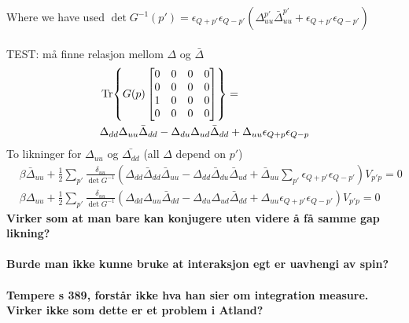 \documentclass{article}
\begin{document}
Where we have used $\det{G^{-1}}(p') = \epsilon_{Q+p'} \epsilon_{Q-p'} \left( \Delta^{p'}_{uu} \bar{\Delta}^{p'}_{uu} + \epsilon_{Q+p'} \epsilon_{Q-p'}\right)$
\\
\\
TEST:
må finne relasjon mellom $\Delta$ og $\bar{\Delta}$
\begin{align}
&\Tr{G(p) 
    \begin{bmatrix}
    0 & 0 & 0 & 0 \\
    0 & 0 & 0 & 0 \\ 
    1 & 0 & 0 & 0 \\ 
    0 & 0 & 0 & 0
    \end{bmatrix}}= \\ 
&\Delta_{dd} \Delta_{uu} \bar{\Delta}_{dd} - \Delta_{du} \Delta_{ud} \bar{\Delta}_{dd} + \Delta_{uu} \epsilon_{Q+p} \epsilon_{Q-p}
\end{align}
To likninger for $\Delta_{uu}$ og $\bar{\Delta_{dd}}$ (all $\Delta$ depend on $p'$)
\begin{align}
    &\beta{\bar{\Delta}}_{uu} + \frac{1}{2} \sum_{p'} \frac{\delta_{uu}}{\det{G^{-1}}}\left(\Delta_{dd} \bar{\Delta}_{dd} \bar{\Delta}_{uu} - \Delta_{dd} \bar{\Delta}_{du} \bar{\Delta}_{ud} + \bar{\Delta}_{uu} \sum_{p'} \epsilon_{Q+p'} \epsilon_{Q-p'}\right) V_{p'p} = 0\nonumber\\
    &\beta{\Delta}_{uu} + \frac{1}{2} \sum_{p'} \frac{\delta_{uu}}{\det{G^{-1}}} \left(\Delta_{dd} \Delta_{uu} \bar{\Delta}_{dd} - \Delta_{du} \Delta_{ud} \bar{\Delta}_{dd} + \Delta_{uu} \epsilon_{Q+p'} \epsilon_{Q-p'}\right) V_{p'p} = 0\nonumber
\end{align}
\textbf{Virker som at man bare kan konjugere uten videre å få samme gap likning?}
\\
\\
\textbf{Burde man ikke kunne bruke at interaksjon egt er uavhengi av spin?}
\\
\\
\textbf{Tempere s 389, forstår ikke hva han sier om integration measure. Virker ikke som dette er et problem i Atland?}
\printbibliography
\end{document}
